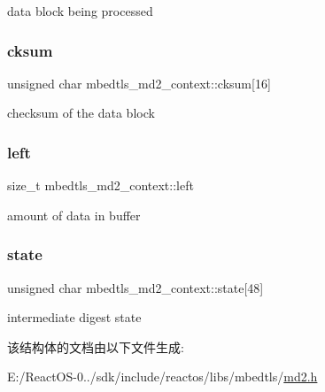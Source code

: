 data block being processed \mbox{\label{structmbedtls__md2__context_a12653607373c617159907a4b5d533c94}} 
\subsubsection{\texorpdfstring{cksum}{cksum}}
{\footnotesize\ttfamily unsigned char mbedtls\+\_\+md2\+\_\+context\+::cksum\mbox{[}16\mbox{]}}

checksum of the data block \mbox{\label{structmbedtls__md2__context_a5b070937560df586b3b20287cc6c4bbe}} 
\subsubsection{\texorpdfstring{left}{left}}
{\footnotesize\ttfamily size\+\_\+t mbedtls\+\_\+md2\+\_\+context\+::left}

amount of data in buffer \mbox{\label{structmbedtls__md2__context_a2849ae4cd7a078459349c046e97ae503}} 
\subsubsection{\texorpdfstring{state}{state}}
{\footnotesize\ttfamily unsigned char mbedtls\+\_\+md2\+\_\+context\+::state\mbox{[}48\mbox{]}}

intermediate digest state 

该结构体的文档由以下文件生成\+:\begin{DoxyCompactItemize}
\item 
E\+:/\+React\+O\+S-\/0../sdk/include/reactos/libs/mbedtls/\hyperlink{md2_8h}{md2.\+h}\end{DoxyCompactItemize}
